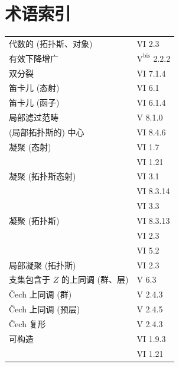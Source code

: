 \chapter*{术语索引}
\begingroup
\small
\setlength{\LTleft}{0pt}
\setlength{\LTright}{0pt}
\begin{longtable}{@{}p{.68\linewidth}p{.27\linewidth}@{}}
代数的 (拓扑斯、对象) & VI 2.3\\
有效下降增广 & $\mathrm{V}^{\mathrm{bis}}$ 2.2.2\\
双分裂 & VI 7.1.4\\
笛卡儿 (态射) & VI 6.1\\
笛卡儿 (函子) & VI 6.1.4\\
局部滤过范畴 & V 8.1.0\\
(局部拓扑斯的) 中心 & VI 8.4.6\\
凝聚 (态射) & VI 1.7\\
& VI 1.21\\
凝聚 (拓扑斯态射) & VI 3.1\\
& VI 8.3.14\\
& VI 3.3\\
凝聚 (拓扑斯) & VI 8.3.13\\
& VI 2.3\\
& VI 5.2\\
局部凝聚 (拓扑斯) & VI 2.3\\
支集包含于 $Z$ 的上同调 (群、层) & V 6.3\\
Čech 上同调 (群) & V 2.4.3\\
Čech 上同调 (预层) & V 2.4.5\\
Čech 复形 & V 2.4.3\\
可构造 & VI 1.9.3\\
& VI 1.21\\

\end{longtable}
